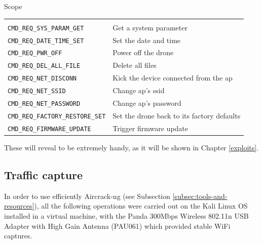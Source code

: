 \begin{chaptercover}{Scope}
\begin{center}
  \begin{tabular}{C{7cm}L{7cm}}
   &  \\
  \texttt{CMD\_REQ\_SYS\_PARAM\_GET} & Get a system parameter \\
  \texttt{CMD\_REQ\_DATE\_TIME\_SET} & Set the date and time \\
  \texttt{CMD\_REQ\_PWR\_OFF} & Power off the drone \\
  \texttt{CMD\_REQ\_DEL\_ALL\_FILE} & Delete all files \\
  \texttt{CMD\_REQ\_NET\_DISCONN} & Kick the device connected from the \acrshort{ap} \\
  \texttt{CMD\_REQ\_NET\_SSID} & Change \acrshort{ap}'s \acrshort{ssid} \\
  \texttt{CMD\_REQ\_NET\_PASSWORD} & Change \acrshort{ap}'s password \\
  \texttt{CMD\_REQ\_FACTORY\_RESTORE\_SET} & Set the drone back to its factory defaults \\
  \texttt{CMD\_REQ\_FIRMWARE\_UPDATE} & Trigger firmware update \\
  \end{tabular}
\end{center}

These will reveal to be extremely handy, as it will be shown in Chapter \ref{exploits}.

\subsection{Traffic capture}\label{subsec:traffic-capture}

\begin{warning}
In order to use efficiently Aircrack-ng (see Subsection \ref{subsec:tools-and-resources}), all the following operations were carried out on the Kali Linux OS installed in a virtual machine, with the Panda 300Mbps Wireless 802.11n USB Adapter with High Gain Antenna (PAU061) which provided stable WiFi captures.
\end{warning}



\end{chaptercover}
